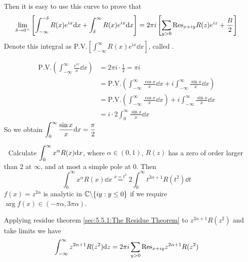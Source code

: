 Then it is easy to use this curve to prove that 
\begin{equation*}
    \lim_{\delta\to 0^+}\left[\int_{-\infty}^{-\delta}R(x)e^{ix}\mathrm{d} x+\int_{\delta}^\infty R(x)e^{ix}\mathrm{d} x\right]=2\pi i \left[\sum_{y>0}\mathrm{Res}_{x+iy}R(z)e^{iz}+\frac{B}{2}\right]
\end{equation*}
Denote this integral as  $ \mathrm{P.V.}\left[\int_{-\infty}^\infty R(x)e^{ix}\dd x\right] $, called .

\begin{example}
    \begin{align*}
        \mathrm{P.V.}\left(\int_{-\infty}^\infty \frac{e^{ix}}{x}\dd x\right)&=2\pi i \cdot\frac{1 }{2}=\pi i\\
        &=\mathrm{P.V.}\left(\int_{-\infty}^\infty \frac{\cos x}{x}\dd x+i\int_{-\infty}^\infty\frac{\sin x}{x}\dd x\right)\\
        &=\mathrm{P.V.}\left(\int_{-\infty}^\infty \frac{\cos x}{x}\dd x\right)+i\int_{-\infty}^\infty \frac{\sin x}{x}\dd x\\
        &=i\cdot 2\int_{0}^\infty\frac{\sin x}{x}\dd x
    \end{align*}
    So we obtain  $ \displaystyle\int_0^\infty\frac{\sin x}{x}\mathrm{d} x=\frac{\pi }{2} $ 
\end{example}
\noindent{}\,\,\,\,Calculate  $ \displaystyle\int_0^\infty x^\alpha R(x)\mathrm{d} x $, where  $ \alpha\in(0,1) $, $ R(z) $ has a zero of order larger than  $ 2 $ at  $ \infty $, and at most a simple pole at  $ 0 $.
Then 
\begin{equation}
    \int_0^\infty x^\alpha R(x)\dd x\overset{x=t^2}{=}2\int_0^\infty t^{2\alpha+1}R(t^2)\dd t
\end{equation}
$ f(x)=z^{2\alpha } $ is analytic in  $ \mathbb C\backslash\{iy:y \leq 0\} $ if we require  $ \arg f(x)\in(-\pi \alpha,3\pi\alpha) $. 

\begin{figure}[!ht]
    \centering
\end{figure}

Applying residue theorem \ref{sec:5.5.1:The Residue Theorem} to  $ z^{2\alpha+1}R(z^2) $ and take limits we have 
\begin{equation*}
    \int_{-\infty}^\infty z^{2\alpha+1}R(z^2)\mathrm{d} z=2\pi i\sum_{y>0}\mathrm{Res}_{x+iy}z^{2\alpha+1}R(z^2)
\end{equation*}
